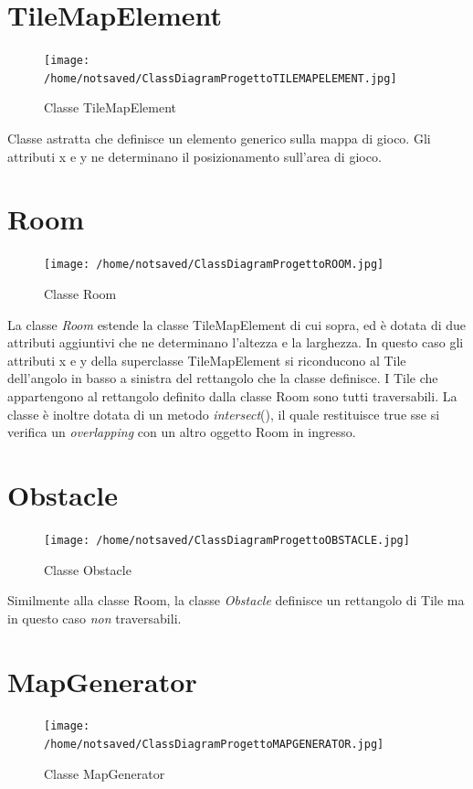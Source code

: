 \documentclass[11pt]{book}
\begin{document}
\section{TileMapElement}
\begin{figure}[H]
\centering
\texttt{[image: /home/notsaved/ClassDiagramProgettoTILEMAPELEMENT.jpg]}
\caption{Classe TileMapElement}
\label{tilemapelement}
\end{figure}

Classe astratta che definisce un elemento generico sulla mappa di gioco. Gli attributi x e y ne determinano il posizionamento sull'area di gioco.

\section{Room}

\begin{figure}[H]
\centering
\texttt{[image: /home/notsaved/ClassDiagramProgettoROOM.jpg]}
\caption{Classe Room}
\label{classroom}
\end{figure}

La classe \emph{Room} estende la classe TileMapElement di cui sopra, ed \`e dotata di due attributi aggiuntivi che ne determinano l'altezza e la larghezza. In questo caso gli attributi x e y della superclasse TileMapElement si riconducono al Tile dell'angolo in basso a sinistra del rettangolo che la classe definisce. I Tile che appartengono al rettangolo definito dalla classe Room sono tutti traversabili. La classe \`e inoltre dotata di un metodo \emph{intersect}(), il quale restituisce true sse si verifica un \emph{overlapping} con un altro oggetto Room in ingresso.

\section{Obstacle}
\begin{figure}[H]
\centering
\texttt{[image: /home/notsaved/ClassDiagramProgettoOBSTACLE.jpg]}
\caption{Classe Obstacle}
\label{classobstacle}
\end{figure}

Similmente alla classe Room, la classe \emph{Obstacle} definisce un rettangolo di Tile ma in questo caso \emph{non} traversabili.

\section{MapGenerator}
\begin{figure}[H]
\centering
\texttt{[image: /home/notsaved/ClassDiagramProgettoMAPGENERATOR.jpg]}
\caption{Classe MapGenerator}
\label{classmapgenerator}
\end{figure}
\end{document}
